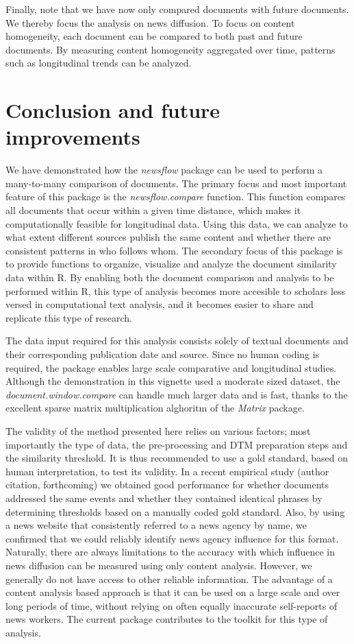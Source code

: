 Finally, note that we have now only compared documents with future
documents. We thereby focus the analysis on news diffusion. To focus on
content homogeneity, each document can be compared to both past and
future documents. By measuring content homogeneity aggregated over time,
patterns such as longitudinal trends can be analyzed.

\section{Conclusion and future improvements}

We have demonstrated how the \emph{newsflow} package can be used to
perform a many-to-many comparison of documents. The primary focus and
most important feature of this package is the \emph{newsflow.compare}
function. This function compares all documents that occur within a given
time distance, which makes it computationally feasible for longitudinal
data. Using this data, we can analyze to what extent different sources
publish the same content and whether there are consistent patterns in
who follows whom. The secondary focus of this package is to provide
functions to organize, visualize and analyze the document similarity
data within R. By enabling both the document comparison and analysis to
be performed within R, this type of analysis becomes more accesible to
scholars less versed in computational text analysis, and it becomes
easier to share and replicate this type of research.

The data input required for this analysis consists solely of textual
documents and their corresponding publication date and source. Since no
human coding is required, the package enables large scale comparative
and longitudinal studies. Although the demonstration in this vignette
used a moderate sized dataset, the \emph{document.window.compare} can
handle much larger data and is fast, thanks to the excellent sparse
matrix multiplication alghoritm of the \emph{Matrix} package.

The validity of the method presented here relies on various factors;
most importantly the type of data, the pre-processing and DTM
preparation steps and the similarity threshold. It is thus recommended
to use a gold standard, based on human interpretation, to test its
validity. In a recent empirical study (author citation, forthcoming) we
obtained good performance for whether documents addressed the same
events and whether they contained identical phrases by determining
thresholds based on a manually coded gold standard. Also, by using a
news website that consistently referred to a news agency by name, we
confirmed that we could reliably identify news agency influence for this
format. Naturally, there are always limitations to the accuracy with
which influence in news diffusion can be measured using only content
analysis. However, we generally do not have access to other reliable
information. The advantage of a content analysis based approach is that
it can be used on a large scale and over long periods of time, without
relying on often equally inaccurate self-reports of news workers. The
current package contributes to the toolkit for this type of analysis.

